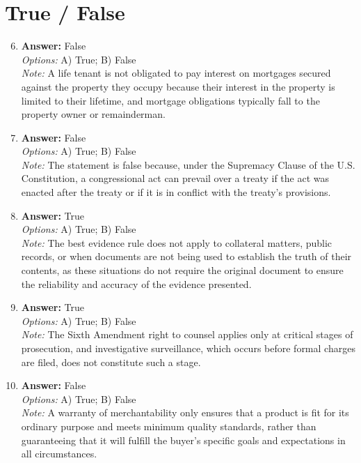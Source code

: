 \documentclass[12pt]{article}
\begin{document}
\section*{True / False}
\begin{enumerate}[label=\arabic*.]
\setcounter{enumi}{5}
\item \textbf{Answer:} False
\\ \textit{Options:} A) True; B) False
\\ \textit{Note:} A life tenant is not obligated to pay interest on mortgages secured against the property they occupy because their interest in the property is limited to their lifetime, and mortgage obligations typically fall to the property owner or remainderman.
\item \textbf{Answer:} False
\\ \textit{Options:} A) True; B) False
\\ \textit{Note:} The statement is false because, under the Supremacy Clause of the U.S. Constitution, a congressional act can prevail over a treaty if the act was enacted after the treaty or if it is in conflict with the treaty's provisions.
\item \textbf{Answer:} True
\\ \textit{Options:} A) True; B) False
\\ \textit{Note:} The best evidence rule does not apply to collateral matters, public records, or when documents are not being used to establish the truth of their contents, as these situations do not require the original document to ensure the reliability and accuracy of the evidence presented.
\item \textbf{Answer:} True
\\ \textit{Options:} A) True; B) False
\\ \textit{Note:} The Sixth Amendment right to counsel applies only at critical stages of prosecution, and investigative surveillance, which occurs before formal charges are filed, does not constitute such a stage.
\item \textbf{Answer:} False
\\ \textit{Options:} A) True; B) False
\\ \textit{Note:} A warranty of merchantability only ensures that a product is fit for its ordinary purpose and meets minimum quality standards, rather than guaranteeing that it will fulfill the buyer's specific goals and expectations in all circumstances.
\end{enumerate}
\end{document}
